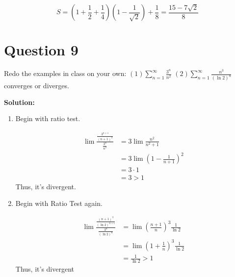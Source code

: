 \documentclass[11pt]{article} %
\begin{document}
$$S=(1+\frac{1}{2}+\frac{1}{4})(1-\frac{1}{\sqrt{2}})+\frac{1}{8}=\frac{15-7\sqrt{2}}{8}$$

\section{Question 9}
Redo the examples in class on your own: $(1) \sum_{n=1}^{\infty}\frac{3^n}{n^2}$  $(2) \sum_{n=1}^{\infty}\frac{n^3}{(\ln2)^n}$ converges or diverges. 

\textbf{Solution:}
\begin{enumerate}
	\item 
	
	Begin with ratio test.
	
	\begin{align*}
		\lim \frac{\frac{3^{n+1}}{(n+1)^2}}{\frac{3^n}{n^2}}&= 3\lim \frac{n^2}{n^2+1}\\
		&= 3\lim (1-\frac{1}{n+1})^2\\
		&= 3\cdot 1\\
		&=3>1
	\end{align*}
Thus, it's divergent.

\item Begin with Ratio Test again. 

\begin{align*}
	\lim \frac{\frac{(n+1)^3}{(\ln2)^{n+1}}}{\frac{3^n}{(\ln2)^n}}&=\lim \left(\frac{n+1}{n}\right)^3\frac{1}{\ln 2}\\
	&= \lim \left(1+\frac{1}{n}\right)^3\frac{1}{\ln 2}\\
	&= \frac{1}{\ln 2}>1
\end{align*}
Thus, it's divergent	
\end{enumerate}
	
	
	
	
	
\end{document}
